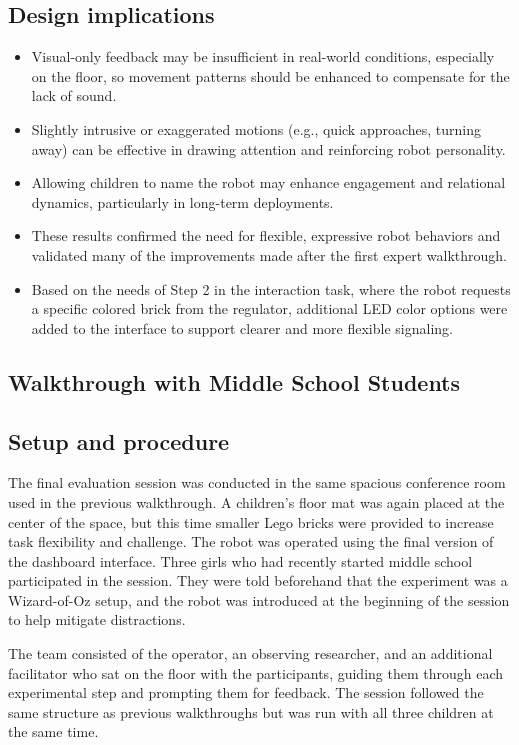 \documentclass[a4paper]{usiinfbachelorproject}
\begin{document}
\subsection*{\textbf{Design implications}}
\begin{itemize}
    \item Visual-only feedback may be insufficient in real-world conditions, especially on the floor, so movement patterns should be enhanced to compensate for the lack of sound.
    \item Slightly intrusive or exaggerated motions (e.g., quick approaches, turning away) can be effective in drawing attention and reinforcing robot personality.
    \item Allowing children to name the robot may enhance engagement and relational dynamics, particularly in long-term deployments.
    \item These results confirmed the need for flexible, expressive robot behaviors and validated many of the improvements made after the first expert walkthrough.
    \item Based on the needs of Step 2 in the interaction task, where the robot requests a specific colored brick from the regulator, additional LED color options were added to the interface to support clearer and more flexible signaling.
\end{itemize}

\subsection{\textbf{Walkthrough with Middle School Students}}\label{sec:middle-school-walkthrough}
\subsection*{\textbf{Setup and procedure}}
The final evaluation session was conducted in the same spacious conference room used in the previous walkthrough.
A children's floor mat was again placed at the center of the space, but this time smaller Lego bricks were provided to increase task flexibility and challenge.
The robot was operated using the final version of the dashboard interface.
Three girls who had recently started middle school participated in the session.
They were told beforehand that the experiment was a Wizard-of-Oz setup, and the robot was introduced at the beginning of the session to help mitigate distractions.

The team consisted of the operator, an observing researcher, and an additional facilitator who sat on the floor with the participants, guiding them through each experimental step and prompting them for feedback.
The session followed the same structure as previous walkthroughs but was run with all three children at the same time.
\end{document}
